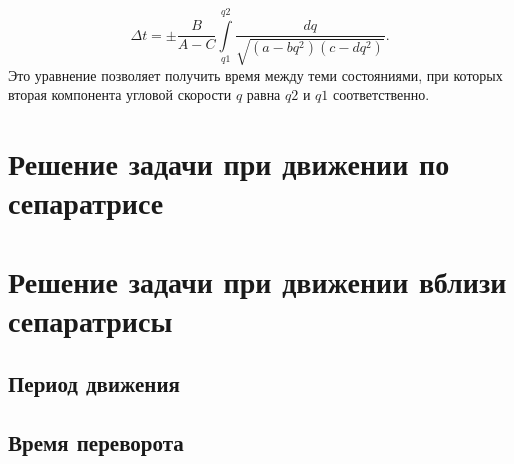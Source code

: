 \documentclass{article}
\begin{document}
\begin{equation}
\Delta t=\pm\frac{B}{A-C}{\int\limits_{q1}^{q2}\frac{dq}{\sqrt{(a-bq^2)(c-dq^2)}}}.
\end{equation}
Это уравнение позволяет получить время между теми состояниями, при которых вторая компонента угловой скорости \begin{math} q \end{math} равна \begin{math} q2 \end{math} и \begin{math} q1 \end{math} соответственно.
\section{Решение задачи при движении по сепаратрисе}
\section{Решение задачи при движении вблизи сепаратрисы}
\subsection{Период движения}
\subsection{Время переворота}
\end{document}
